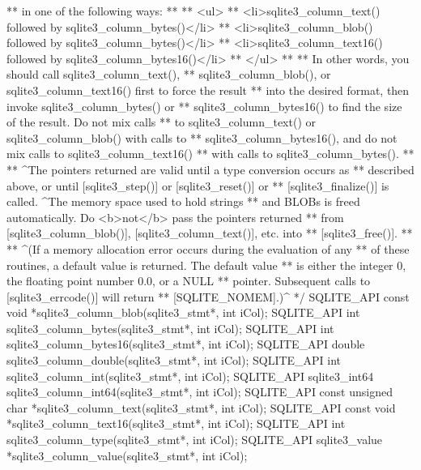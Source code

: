 \begin{Codex}[label=sqlite3.h,numbers=left]
{** in one of the following ways:
**
** <ul>
**  <li>sqlite3_column_text() followed by sqlite3_column_bytes()</li>
**  <li>sqlite3_column_blob() followed by sqlite3_column_bytes()</li>
**  <li>sqlite3_column_text16() followed by sqlite3_column_bytes16()</li>
** </ul>
**
** In other words, you should call sqlite3_column_text(),
** sqlite3_column_blob(), or sqlite3_column_text16() first to force the result
** into the desired format, then invoke sqlite3_column_bytes() or
** sqlite3_column_bytes16() to find the size of the result.  Do not mix calls
** to sqlite3_column_text() or sqlite3_column_blob() with calls to
** sqlite3_column_bytes16(), and do not mix calls to sqlite3_column_text16()
** with calls to sqlite3_column_bytes().
**
** ^The pointers returned are valid until a type conversion occurs as
** described above, or until [sqlite3_step()] or [sqlite3_reset()] or
** [sqlite3_finalize()] is called.  ^The memory space used to hold strings
** and BLOBs is freed automatically.  Do <b>not</b> pass the pointers returned
** from [sqlite3_column_blob()], [sqlite3_column_text()], etc. into
** [sqlite3_free()].
**
** ^(If a memory allocation error occurs during the evaluation of any
** of these routines, a default value is returned.  The default value
** is either the integer 0, the floating point number 0.0, or a NULL
** pointer.  Subsequent calls to [sqlite3_errcode()] will return
** [SQLITE_NOMEM].)^
*/
SQLITE_API const void *sqlite3_column_blob(sqlite3_stmt*, int iCol);
SQLITE_API int sqlite3_column_bytes(sqlite3_stmt*, int iCol);
SQLITE_API int sqlite3_column_bytes16(sqlite3_stmt*, int iCol);
SQLITE_API double sqlite3_column_double(sqlite3_stmt*, int iCol);
SQLITE_API int sqlite3_column_int(sqlite3_stmt*, int iCol);
SQLITE_API sqlite3_int64 sqlite3_column_int64(sqlite3_stmt*, int iCol);
SQLITE_API const unsigned char *sqlite3_column_text(sqlite3_stmt*, int iCol);
SQLITE_API const void *sqlite3_column_text16(sqlite3_stmt*, int iCol);
SQLITE_API int sqlite3_column_type(sqlite3_stmt*, int iCol);
SQLITE_API sqlite3_value *sqlite3_column_value(sqlite3_stmt*, int iCol);

}
\end{Codex}
